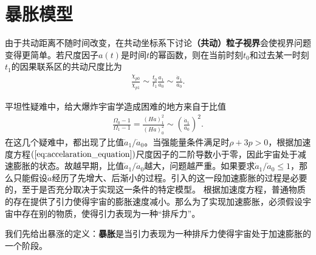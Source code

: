 \section{暴胀模型}
由于共动距离不随时间改变，在共动坐标系下讨论\textbf{（共动）粒子视界}会使视界问题变得更简单。若尺度因子$a(t)$是时间$t$的幂函数，则在当前时刻$t_0$和过去某一时刻$t_1$的因果联系区的共动尺度比为
\begin{align}
  \frac{\chi_{p 0}}{\chi_{p 1}}\sim \frac{t_0}{t_1}\frac{a_1}{a_0}
  \sim \frac{\dot{a}_1}{\dot{a}_0}.
\end{align}

平坦性疑难中，给大爆炸宇宙学造成困难的地方来自于比值
\begin{align}
  \label{eq:flatness-of-space}
  \frac{\Omega_0-1}{\Omega_1-1}=
  \frac{{\left(Ha\right)}^2_{1}}{{\left(Ha\right)}^2_{0}}
  \sim {\left(\frac{\dot{a}_1}{\dot{a}_0}\right)}^2.
\end{align}
在这几个疑难中，都出现了比值$\dot{a}_1 /
\dot{a}_0$。当强能量条件满足时$\rho+3p>0$，根据加速度方程$(\ref{eq:accelaration_equation})$尺度因子的二阶导数小于零，因此宇宙处于减速膨胀的状态。故越早期，比值$\dot{a}_1
/\dot{a}_0$越大，问题越严重。如果要求$\dot{a}_1
/\dot{a}_0\leq
1$，那么只能假设$\dot{a}$经历了先增大、后渐小的过程。引入的这一段加速膨胀的过程是必要的，至于是否充分取决于实现这一条件的特定模型。
根据加速度方程，普通物质的存在提供了引力使得宇宙的膨胀速度减小。那么为了实现加速膨胀，必须假设宇宙中存在别的物质，使得引力表现为一种“排斥力”。

我们先给出暴涨的定义：\textbf{暴胀}是当引力表现为一种排斥力使得宇宙处于加速膨胀的一个阶段。

